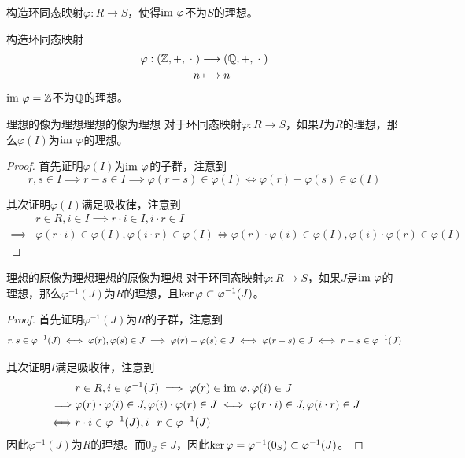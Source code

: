 \begin{problem}
	构造环同态映射$\varphi:R\to S$，使得$\text{im } \varphi$不为$S$的理想。
\end{problem}

\begin{solution}
	构造环同态映射
	\begin{align*}
		\varphi:\begin{aligned}[t]
			(\mathbb{Z},+,\;\cdot\;)&\longrightarrow(\mathbb{Q},+,\;\cdot\;)\\
			n&\longmapsto n
		\end{aligned}
	\end{align*}
	$\text{im } \varphi=\mathbb{Z}$不为$\mathbb{Q}$的理想。
\end{solution}

\begin{proposition}{理想的像为理想}{理想的像为理想}
	对于环同态映射$\varphi:R\to S$，如果$I$为$R$的理想，那么$\varphi(I)$为$\text{im } \varphi$的理想。
\end{proposition}

\begin{proof}
	首先证明$\varphi(I)$为$\text{im } \varphi$的子群，注意到
	$$
	r,s\in I
	\implies r-s\in I
	\implies \varphi(r-s)\in\varphi(I)
	\iff \varphi(r)-\varphi(s)\in\varphi(I)
	$$
	
	其次证明$\varphi(I)$满足吸收律，注意到
	\begin{align*}
		&r\in R,i\in I
		\implies r\cdot i\in I,i\cdot r\in I\\
		\implies &\varphi(r\cdot i)\in\varphi(I),\varphi(i\cdot r)\in\varphi(I)
		\iff \varphi(r)\cdot \varphi(i)\in\varphi(I),\varphi(i)\cdot \varphi(r)\in\varphi(I)
	\end{align*}
\end{proof}

\begin{proposition}{理想的原像为理想}{理想的原像为理想}
	对于环同态映射$\varphi:R\to S$，如果$J$是$\text{im } \varphi$的理想，那么$\varphi^{-1}(J)$为$R$的理想，且$\ker\varphi\subset\varphi^{-1}(J)$。
\end{proposition}

\begin{proof}
	首先证明$\varphi^{-1}(J)$为$R$的子群，注意到
	$$
	\small{
		r,s\in \varphi^{-1}(J)
		\iff \varphi(r),\varphi(s)\in J
		\implies \varphi(r)-\varphi(s)\in J
		\iff \varphi(r-s)\in J
		\iff r-s \in \varphi^{-1}(J)
	}
	$$
	
	其次证明$I$满足吸收律，注意到
	\begin{align*}
		&r\in R,i\in \varphi^{-1}(J)
		\implies \varphi(r)\in \text{im } \varphi,\varphi(i)\in J\\
		\implies &\varphi(r)\cdot\varphi(i)\in J,\varphi(i)\cdot\varphi(r)\in J
		\iff \varphi(r\cdot i)\in J,\varphi(i\cdot r)\in J\\
		\iff & r\cdot i\in \varphi^{-1}(J),i\cdot r\in \varphi^{-1}(J)
	\end{align*}
	因此$\varphi^{-1}(J)$为$R$的理想。而$0_S\in J$，因此$\ker\varphi=\varphi^{-1}(0_S)\subset \varphi^{-1}(J)$。
\end{proof}

